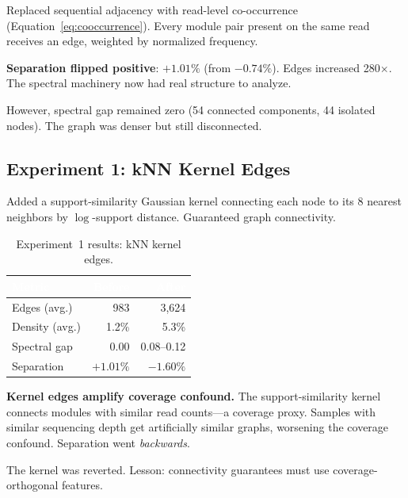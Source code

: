 \documentclass{../yalumba}
\begin{document}
Replaced sequential adjacency with read-level co-occurrence
(Equation~\ref{eq:cooccurrence}).  Every module pair present on the same read
receives an edge, weighted by normalized frequency.

\begin{keyfinding}
\textbf{Separation flipped positive}: $+1.01\%$ (from $-0.74\%$).  Edges
increased 280$\times$.  The spectral machinery now had real structure to
analyze.
\end{keyfinding}

However, spectral gap remained zero (54 connected components, 44 isolated
nodes).  The graph was denser but still disconnected.

\subsection{Experiment 1: kNN Kernel Edges}

Added a support-similarity Gaussian kernel connecting each node to its 8
nearest neighbors by $\log$-support distance.  Guaranteed graph connectivity.

\begin{table}[H]
  \centering
  \tablestyle
  \caption{Experiment~1 results: kNN kernel edges.}
  \label{tab:exp1}
  \begin{tabular}{lrr}
    \toprule
    \rowcolor{table-header}
    \textcolor{white}{\textbf{Metric}} &
    \textcolor{white}{\textbf{Before}} &
    \textcolor{white}{\textbf{After}} \\
    \midrule
    Edges (avg.) & 983 & 3{,}624 \\
    Density (avg.) & 1.2\% & 5.3\% \\
    Spectral gap & 0.00 & 0.08--0.12 \\
    Separation & $+1.01\%$ & $-1.60\%$ \\
    \bottomrule
  \end{tabular}
\end{table}

\begin{limitation}
\textbf{Kernel edges amplify coverage confound.}  The support-similarity kernel
connects modules with similar read counts---a coverage proxy.  Samples with
similar sequencing depth get artificially similar graphs, worsening the coverage
confound.  Separation went \emph{backwards}.
\end{limitation}

The kernel was reverted.  Lesson: connectivity guarantees must use
coverage-orthogonal features.
\end{document}
